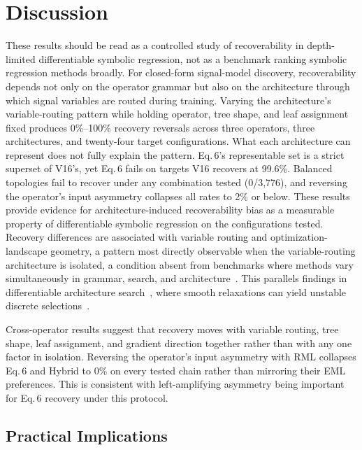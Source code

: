 \section{Discussion}
\label{sec:discussion}

These results should be read as a controlled study of
recoverability in depth-limited differentiable symbolic
regression, not as a benchmark ranking symbolic regression
methods broadly.  For closed-form signal-model discovery,
recoverability depends not only on the operator grammar but also
on the architecture through which signal variables are routed
during training.  Varying the architecture's variable-routing
pattern while holding operator, tree shape, and leaf
assignment fixed produces 0\%--100\% recovery reversals across
three operators, three architectures, and twenty-four target
configurations.  What each architecture can represent does not
fully explain the pattern.  Eq.\,6's representable set is a strict superset
of V16's, yet Eq.\,6 fails on targets V16 recovers at 99.6\%.
Balanced topologies fail to recover under any combination tested
(0/3{,}776), and reversing the operator's input asymmetry collapses
all rates to 2\% or below.  These results provide evidence for architecture-induced
recoverability bias as a measurable property of differentiable
symbolic regression on the configurations tested.  Recovery
differences are associated with variable routing and
optimization-landscape geometry, a pattern most directly
observable when the variable-routing architecture is isolated, a
condition absent from benchmarks where methods vary
simultaneously in grammar, search, and
architecture~\citep{LaCava2021srbench}.  This parallels findings
in differentiable architecture search~\citep{Liu2019darts},
where smooth relaxations can yield unstable discrete
selections~\citep{Zela2020robustdarts}.

Cross-operator results suggest that recovery moves with variable
routing, tree shape, leaf assignment, and gradient direction
together rather than with any one factor in isolation.  Reversing the
operator's input asymmetry with RML collapses Eq.\,6 and Hybrid
to $0\%$ on every tested chain rather than mirroring their EML
preferences.  This is consistent with left-amplifying asymmetry
being important for Eq.\,6 recovery under this protocol.

\subsection{Practical Implications}
\label{sec:practical}

